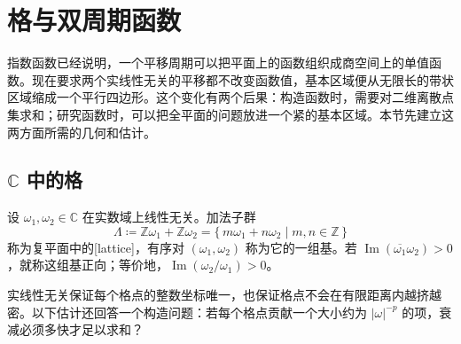 \section{格与双周期函数}
\label{b3:sec:2201}

指数函数已经说明，一个平移周期可以把平面上的函数组织成商空间上的单值函数。现在要求两个实线性无关的平移都不改变函数值，基本区域便从无限长的带状区域缩成一个平行四边形。这个变化有两个后果：构造函数时，需要对二维离散点集求和；研究函数时，可以把全平面的问题放进一个紧的基本区域。本节先建立这两方面所需的几何和估计。

\subsection{\texorpdfstring{\(\mathbb C\)}{C} 中的格}
\label{b3:subsec:220101}

\begin{definition}\label{b3:def:22-lattice}
设 \(\omega_1,\omega_2\in\mathbb C\) 在实数域上线性无关。加法子群
\[
 \Lambda\coloneqq\mathbb Z\omega_1+\mathbb Z\omega_2
 =\{\,m\omega_1+n\omega_2\mid m,n\in\mathbb Z\,\}
\]
称为复平面中的[lattice]，有序对 \((\omega_1,\omega_2)\) 称为它的一组基。若 \(\operatorname{Im}(\overline{\omega_1}\omega_2)>0\)，就称这组基正向；等价地，\(\operatorname{Im}(\omega_2/\omega_1)>0\)。
\end{definition}

实线性无关保证每个格点的整数坐标唯一，也保证格点不会在有限距离内越挤越密。以下估计还回答一个构造问题：若每个格点贡献一个大小约为 \(|\omega|^{-p}\) 的项，衰减必须多快才足以求和？

